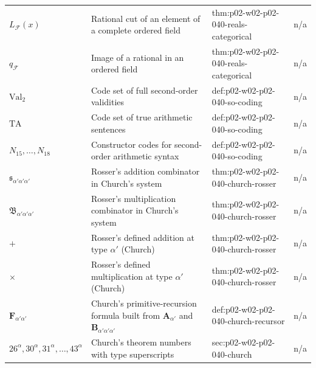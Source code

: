 \begin{longtable}{@{}p{}p{}p{}p{}@{}}
\(L_{\mathcal F}(x)\) & Rational cut of an element of a complete ordered field & thm:\allowbreak{}p02-\allowbreak{}w02-\allowbreak{}p02-\allowbreak{}040-\allowbreak{}reals-\allowbreak{}categorical & n/a \\
\(q_{\mathcal F}\) & Image of a rational in an ordered field & thm:\allowbreak{}p02-\allowbreak{}w02-\allowbreak{}p02-\allowbreak{}040-\allowbreak{}reals-\allowbreak{}categorical & n/a \\
\(\mathrm{Val}_2\) & Code set of full second-order validities & def:\allowbreak{}p02-\allowbreak{}w02-\allowbreak{}p02-\allowbreak{}040-\allowbreak{}so-\allowbreak{}coding & n/a \\
\(\mathrm{TA}\) & Code set of true arithmetic sentences & def:\allowbreak{}p02-\allowbreak{}w02-\allowbreak{}p02-\allowbreak{}040-\allowbreak{}so-\allowbreak{}coding & n/a \\
\(N_{15},\allowbreak \ldots,\allowbreak N_{18}\) & Constructor codes for second-order arithmetic syntax & def:\allowbreak{}p02-\allowbreak{}w02-\allowbreak{}p02-\allowbreak{}040-\allowbreak{}so-\allowbreak{}coding & n/a \\
\(\mathfrak s_{\alpha'\alpha'\alpha'}\) & Rosser's addition combinator in Church's system & thm:\allowbreak{}p02-\allowbreak{}w02-\allowbreak{}p02-\allowbreak{}040-\allowbreak{}church-\allowbreak{}rosser & n/a \\
\(\mathfrak B_{\alpha'\alpha'\alpha'}\) & Rosser's multiplication combinator in Church's system & thm:\allowbreak{}p02-\allowbreak{}w02-\allowbreak{}p02-\allowbreak{}040-\allowbreak{}church-\allowbreak{}rosser & n/a \\
\(+\) & Rosser's defined addition at type \(\alpha'\) (Church) & thm:\allowbreak{}p02-\allowbreak{}w02-\allowbreak{}p02-\allowbreak{}040-\allowbreak{}church-\allowbreak{}rosser & n/a \\
\(\times\) & Rosser's defined multiplication at type \(\alpha'\) (Church) & thm:\allowbreak{}p02-\allowbreak{}w02-\allowbreak{}p02-\allowbreak{}040-\allowbreak{}church-\allowbreak{}rosser & n/a \\
\(\mathbf F_{\alpha'\alpha'}\) & Church's primitive-recursion formula built from \(\mathbf A_{\alpha'}\) and \(\mathbf B_{\alpha'\alpha'\alpha'}\) & def:\allowbreak{}p02-\allowbreak{}w02-\allowbreak{}p02-\allowbreak{}040-\allowbreak{}church-\allowbreak{}recursor & n/a \\
\(26^\alpha,\allowbreak 30^\alpha,\allowbreak 31^\alpha,\allowbreak \ldots,\allowbreak 43^\alpha\) & Church's theorem numbers with type superscripts & sec:\allowbreak{}p02-\allowbreak{}w02-\allowbreak{}p02-\allowbreak{}040-\allowbreak{}church & n/a \\

\end{longtable}
